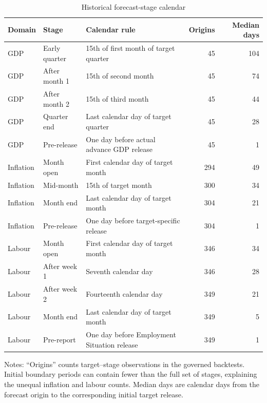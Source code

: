 \begin{table}[H]
\centering
\caption{Historical forecast-stage calendar}
\label{tab:forecast_stages}
\begin{threeparttable}
\footnotesize
\setlength{\tabcolsep}{3pt}
\begin{tabular}{@{}llp{4.2cm}rr@{}}
\toprule
Domain & Stage & Calendar rule & Origins & Median days \\
\midrule
GDP
 & Early quarter
 & 15th of first month of target quarter
 & 45 & 104 \\
GDP
 & After month 1
 & 15th of second month
 & 45 & 74 \\
GDP
 & After month 2
 & 15th of third month
 & 45 & 44 \\
GDP
 & Quarter end
 & Last calendar day of target quarter
 & 45 & 28 \\
GDP
 & Pre-release
 & One day before actual advance GDP release
 & 45 & 1 \\
\addlinespace
Inflation
 & Month open
 & First calendar day of target month
 & 294 & 49 \\
Inflation
 & Mid-month
 & 15th of target month
 & 300 & 34 \\
Inflation
 & Month end
 & Last calendar day of target month
 & 304 & 21 \\
Inflation
 & Pre-release
 & One day before target-specific release
 & 304 & 1 \\
\addlinespace
Labour
 & Month open
 & First calendar day of target month
 & 346 & 34 \\
Labour
 & After week 1
 & Seventh calendar day
 & 346 & 28 \\
Labour
 & After week 2
 & Fourteenth calendar day
 & 349 & 21 \\
Labour
 & Month end
 & Last calendar day of target month
 & 349 & 5 \\
Labour
 & Pre-report
 & One day before Employment Situation release
 & 349 & 1 \\
\bottomrule
\end{tabular}
\begin{tablenotes}[flushleft]\footnotesize
\item Notes: ``Origins'' counts target--stage observations in the governed
backtests. Initial boundary periods can contain fewer than the full set of
stages, explaining the unequal inflation and labour counts. Median days are
calendar days from the forecast origin to the corresponding initial target
release.
\end{tablenotes}
\end{threeparttable}
\end{table}

